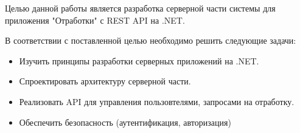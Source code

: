 \intro


Целью данной работы является разработка серверной части системы для приложения "Отработки" с REST API на .NET.

В соответствии с поставленной целью необходимо решить следующие задачи:
\begin{itemize}
	\item{Изучить принципы разработки серверных приложений на .NET.}
	\item{Спроектировать архитектуру серверной части.}
	\item{Реализовать API для управления пользовтелями, запросами на отработку.}
	\item{Обеспечить безопасность (аутентификация, авторизация)}
\end{itemize}

